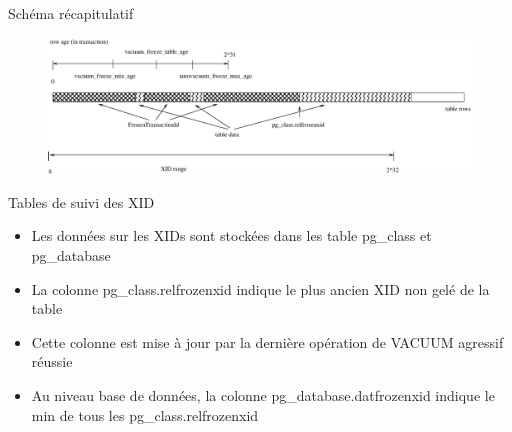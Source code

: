 
\begin{frame}{Schéma récapitulatif}

\begin{figure}
\begin{center}
\includegraphics[angle=0, width=\textwidth]{images/xid_freeze.eps}
\end{center}
\end{figure}

\end{frame}


\begin{frame}{Tables de suivi des XID}

\begin{itemize}
   \item Les données sur les XIDs sont stockées dans les table pg\_class et pg\_database
   \item La colonne pg\_class.relfrozenxid indique le plus ancien XID non gelé de la table
   \item Cette colonne est mise à jour par la dernière opération de VACUUM agressif réussie
   \item Au niveau base de données, la colonne pg\_database.datfrozenxid indique le min de tous les pg\_class.relfrozenxid
\end{itemize}

\end{frame}


